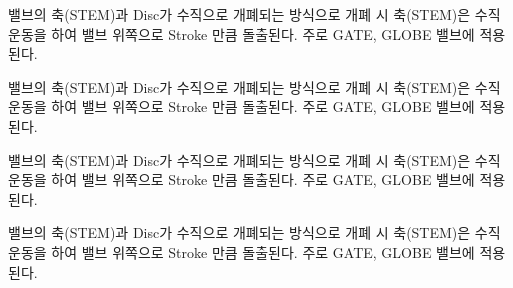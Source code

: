 \documentclass[12pt,a4paper,oneside]{book}
\begin{document}
		\begin{description}[	style=nextline,
							leftmargin=3ex, 
							rightmargin=0.0em, 
							itemsep=0.0em ]
		\item[1. 개요]
	밸브의 축(STEM)과 Disc가 수직으로 개폐되는 방식으로 개폐 시 축(STEM)은 수직운동을 하여 밸브 위쪽으로 Stroke 만큼 돌출된다. 
	주로 GATE, GLOBE 밸브에 적용된다.
	
		\item[2. 문제점 ]
	밸브의 축(STEM)과 Disc가 수직으로 개폐되는 방식으로 개폐 시 축(STEM)은 수직운동을 하여 밸브 위쪽으로 Stroke 만큼 돌출된다. 
	주로 GATE, GLOBE 밸브에 적용된다.
	
		\item[3. 대책]
	밸브의 축(STEM)과 Disc가 수직으로 개폐되는 방식으로 개폐 시 축(STEM)은 수직운동을 하여 밸브 위쪽으로 Stroke 만큼 돌출된다. 
	주로 GATE, GLOBE 밸브에 적용된다.
	
		\item[4. 결론]
	밸브의 축(STEM)과 Disc가 수직으로 개폐되는 방식으로 개폐 시 축(STEM)은 수직운동을 하여 밸브 위쪽으로 Stroke 만큼 돌출된다. 
	주로 GATE, GLOBE 밸브에 적용된다.
	
		\end{description}
	
	


		\newpage
	
	
		\thispagestyle{empty}

		\begin{center}
		\Large
		\end{center}
	

		\begin{center}
		\Large
		\end{center}
\end{document}
